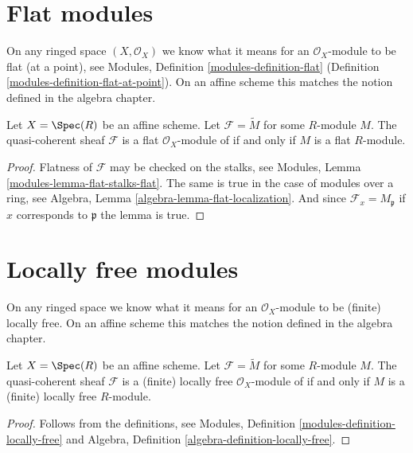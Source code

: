 \section{Flat modules}
\label{section-flat}

\noindent
On any ringed space $(X, \mathcal{O}_X)$
we know what it means for an $\mathcal{O}_X$-module
to be flat (at a point), see
Modules, Definition \ref{modules-definition-flat}
(Definition \ref{modules-definition-flat-at-point}).
On an affine scheme this matches the notion
defined in the algebra chapter.

\begin{lemma}
\label{lemma-flat-module}
Let $X = \Spec(R)$ be an affine scheme.
Let $\mathcal{F} = \widetilde{M}$ for some $R$-module $M$.
The quasi-coherent sheaf $\mathcal{F}$ is a flat
$\mathcal{O}_X$-module of if and only if $M$ is a flat $R$-module.
\end{lemma}

\begin{proof}
Flatness of $\mathcal{F}$ may be checked on the stalks, see
Modules, Lemma \ref{modules-lemma-flat-stalks-flat}.
The same is true in the case of modules over a ring, see
Algebra, Lemma \ref{algebra-lemma-flat-localization}.
And since $\mathcal{F}_x = M_{\mathfrak p}$ if $x$ corresponds
to $\mathfrak p$ the lemma is true.
\end{proof}





\section{Locally free modules}
\label{section-finite-locally-free}

\noindent
On any ringed space we know what it means for an $\mathcal{O}_X$-module
to be (finite) locally free. On an affine scheme this matches the notion
defined in the algebra chapter.

\begin{lemma}
\label{lemma-locally-free-module}
Let $X = \Spec(R)$ be an affine scheme.
Let $\mathcal{F} = \widetilde{M}$ for some $R$-module $M$.
The quasi-coherent sheaf $\mathcal{F}$ is a (finite) locally free
$\mathcal{O}_X$-module of if and only if $M$ is a (finite)
locally free $R$-module.
\end{lemma}

\begin{proof}
Follows from the definitions, see
Modules, Definition \ref{modules-definition-locally-free}
and
Algebra, Definition \ref{algebra-definition-locally-free}.
\end{proof}

